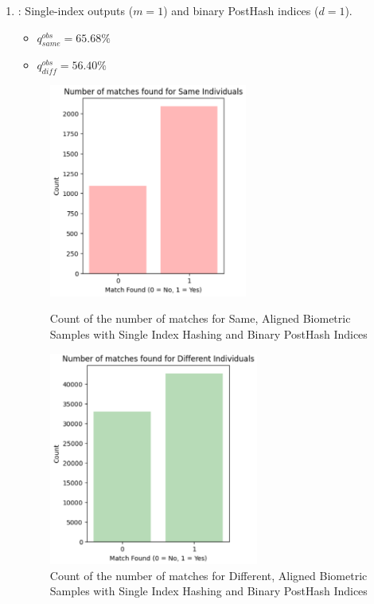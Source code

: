 \begin{enumerate}
    \item {}: Single-index outputs (\(m=1\)) and binary PostHash indices (\(d=1\)).
    \begin{itemize}
        \item \(q_{same}^{obs} = 65.68\%\)
        \item \(q_{diff}^{obs} = 56.40\%\)
    \end{itemize}

    \begin{figure}[H]
        \centering
        \begin{minipage}[b]{0.48\linewidth}
            \centering
            \includegraphics[width=\linewidth,height=7cm,keepaspectratio]{latex-img/d1same.png}
            \caption{Count of the number of matches for Same, Aligned Biometric Samples with Single Index Hashing and Binary PostHash Indices}
            \label{mu_same}
        \end{minipage}
        \hfill
        \begin{minipage}[b]{0.48\linewidth}
            \centering
            \includegraphics[width=\linewidth,height=7cm,keepaspectratio]{latex-img/d1diff.png}
            \caption{Count of the number of matches for Different, Aligned Biometric Samples with Single Index Hashing and Binary PostHash Indices}
            \label{mu_diff}
        \end{minipage}
    \end{figure}
    

\end{enumerate}
